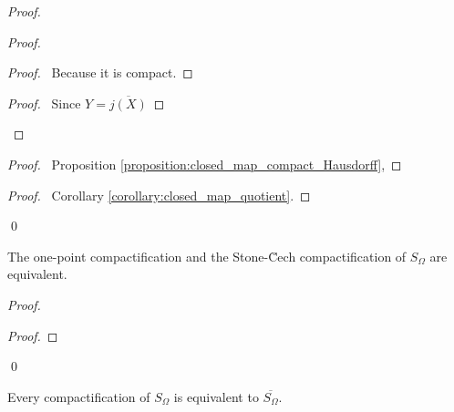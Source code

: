 \begin{proof}
    \pf
    \begin{proof}
        \begin{proof}
            \pf\ Because it is compact.
        \end{proof}
        \begin{proof}
            \pf\ Since $Y = \overline{j(X)}$
        \end{proof}
    \end{proof}
    \begin{proof}
        \pf\ Proposition \ref{proposition:closed_map_compact_Hausdorff},
    \end{proof}
    \qedstep
    \begin{proof}
        \pf\ Corollary \ref{corollary:closed_map_quotient}.
    \end{proof}
    \qed
\end{proof}

\begin{proposition}
    The one-point compactification and the Stone-\u{C}ech compactification of $S_\Omega$ are equivalent.
\end{proposition}

\begin{proof}
    \pf
    \begin{proof}
    \end{proof}
    \qed
\end{proof}

\begin{corollary}
    Every compactification of $S_\Omega$ is equivalent to $\overline{S_\Omega}$.
\end{corollary}

